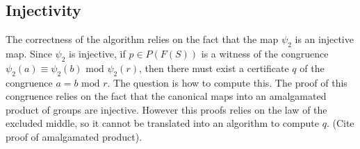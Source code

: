 \documentclass[11pt]{article} %
\theoremstyle{definition}
\theoremstyle{definition}
\theoremstyle{definition}
\theoremstyle{definition}
\theoremstyle{definition}
\theoremstyle{definition}
\begin{document}





\subsection{Injectivity}\label{powproof}

The correctness of the algorithm relies on the fact that the map $\psi_2$ is an injective map.
Since $\psi_2$ is injective, if $p \in P(F(S))$ is a witness of the congruence
$\psi_2(a) \equiv \psi_2(b) \text{ mod } \psi_2(r)$, then there must exist a certificate
$q$ of the congruence $a = b \text{ mod }r$. The question is how to compute this. The proof
of this congruence relies on the fact that the canonical maps into an amalgamated product
of groups are injective. However this proofs relies on the law of the excluded middle, so
it cannot be translated into an algorithm to compute $q$. (Cite proof of amalgamated product).
\end{document}
